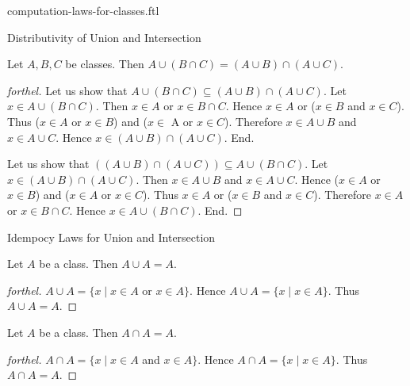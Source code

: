 \documentclass{naproche-library}
\begin{document}
\begin{smodule}[title=Computation Laws For Classes]{computation-laws-for-classes.ftl}
\begin{sfragment}{Distributivity of Union and Intersection}
  \begin{proposition}[forthel,id=FOUNDATIONS_02_5937390721957888]
    Let $A, B, C$ be classes.
    Then $A \cup (B \cap C) = (A \cup B) \cap (A \cup C)$.
  \end{proposition}
  \begin{proof}[forthel]
    Let us show that $A \cup (B \cap C) \subseteq (A \cup B) \cap (A \cup C)$.
      Let $x \in A \cup (B \cap C)$.
      Then $x \in A$ or $x \in B \cap C$.
      Hence $x \in A$ or ($x \in B$ and $x \in C$).
      Thus ($x \in A$ or $x \in B$) and ($x \in$ A or $x \in C$).
      Therefore $x \in A \cup B$ and $x \in A \cup C$.
      Hence $x \in (A \cup B) \cap (A \cup C)$.
    End.

    Let us show that $((A \cup B) \cap (A \cup C)) \subseteq A \cup (B \cap C)$. %
      Let $x \in (A \cup B) \cap (A \cup C)$.
      Then $x \in A \cup B$ and $x \in A \cup C$.
      Hence ($x \in A$ or $x \in B$) and ($x \in A$ or $x \in C$).
      Thus $x \in A$ or ($x \in B$ and $x \in C$).
      Therefore $x \in A$ or $x \in B \cap C$.
      Hence $x \in A \cup (B \cap C)$.
    End.
  \end{proof}
\end{sfragment}

\begin{sfragment}{Idempocy Laws for Union and Intersection}
  \begin{proposition}[forthel,id=FOUNDATIONS_02_2096996737351680]
    Let $A$ be a class.
    Then $A \cup A = A$.
  \end{proposition}
  \begin{proof}[forthel]
    $A \cup A = \{x \mid x \in A$ or $x \in A \}$.
    Hence $A \cup A = \{ x \mid x \in A \}$.
    Thus $A \cup A = A$.
  \end{proof}

  \begin{proposition}[forthel,id=FOUNDATIONS_02_4053144145231872]
    Let $A$ be a class.
    Then $A \cap A = A$.
  \end{proposition}
  \begin{proof}[forthel]
    $A \cap A = \{ x \mid x \in A$ and $x \in A \}$.
    Hence $A \cap A = \{ x \mid x \in A \}$.
    Thus $A \cap A = A$.
  \end{proof}
\end{sfragment}


\end{smodule}
\end{document}
